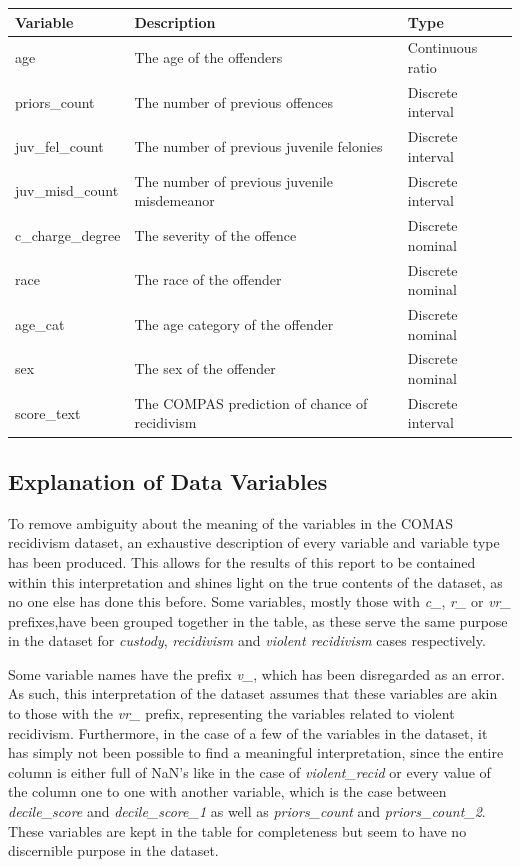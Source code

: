 \documentclass[11pt, fleqn, titlepage]{article}
\begin{document}
	
	\begin{table}[H]\label{resultater}
		\centering
		\begin{tabular}{l l l}
			Variable & Description & Type \\ \hline
			age & The age of the offenders & Continuous ratio \\
			priors\_count & The number of previous offences & Discrete interval \\
			juv\_fel\_count & The number of previous juvenile felonies & Discrete interval \\
			juv\_misd\_count & The number of previous juvenile misdemeanor & Discrete interval \\
			c\_charge\_degree & The severity of the offence & Discrete nominal \\
			race & The race of the offender & Discrete nominal \\
			age\_cat & The age category of the offender & Discrete nominal \\
			sex & The sex of the offender & Discrete nominal \\
			score\_text & The COMPAS prediction of chance of recidivism & Discrete interval
		\end{tabular}
	\end{table}
		
		
	\subsection{Explanation of Data Variables} \label{dataExamination}
	To remove ambiguity about the meaning of the variables in the COMAS recidivism dataset, an exhaustive description of every variable and variable type has been produced. This allows for the results of this report to be contained within this interpretation and shines light on the true contents of the dataset, as no one else has done this before. Some variables, mostly those with \textit{c\_}, \textit{r\_} or \textit{vr\_} prefixes,have been grouped together in the table, as these serve the same purpose in the dataset for \textit{custody}, \textit{recidivism} and \textit{violent recidivism} cases respectively. 
	
	\noindent Some variable names have the prefix \textit{v\_}, which has been disregarded as an error. As such, this interpretation of the dataset assumes that these variables are akin to those with the \textit{vr\_} prefix, representing the variables related to violent recidivism. Furthermore, in the case of a few of the variables in the dataset, it has simply not been possible to find a meaningful interpretation, since the entire column is either full of NaN's like in the case of \textit{violent\_recid} or every value of the column one to one with another variable, which is the case between \textit{decile\_score} and \textit{decile\_score\_1} as well as \textit{priors\_count} and \textit{priors\_count\_2}. These variables are kept in the table for completeness but seem to have no discernible purpose in the dataset.
	
\end{document}
